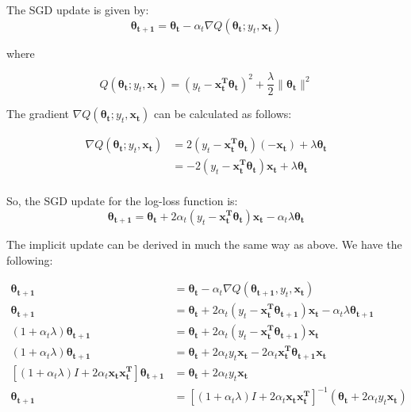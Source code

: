 \documentclass{article}
\renewcommand{\vec}[1]{\boldsymbol{#1}}
\begin{document}
\begin{enumerate}[(a)]
The SGD update is given by:
\begin{equation}
\vec{\theta_{t+1}} = \vec{\theta_{t}} - \alpha_{t}\nabla Q(\vec{\theta_{t}}; y_t, \vec{x_t})
\end{equation}

where

\begin{equation}
Q(\vec{\theta_{t}}; y_t, \vec{x_t}) = \left(y_t - \vec{x_t^T}\vec{\theta_t}\right)^2 + \frac{\lambda}{2}\|\vec{\theta_t}\|^2
\end{equation}

The gradient $\nabla Q(\vec{\theta_{t}}; y_t, \vec{x_t})$ can be calculated as follows:

\begin{align*}
\nabla Q(\vec{\theta_{t}}; y_t, \vec{x_t}) &= 2\left(y_t - \vec{x_t^T}\vec{\theta_t}\right)\left(-\vec{x_t}\right) + \lambda\vec{\theta_t}\\
&= -2(y_t-\vec{x_t^T}\vec{\theta_t})\vec{x_t} + \lambda\vec{\theta_t}\\
\end{align*}

So, the SGD update for the log-loss function is:
\begin{equation}
\vec{\theta_{t+1}} = \vec{\theta_{t}} +2 \alpha_{t}\left( y_t-\vec{x_t^T}\vec{\theta_t} \right )\vec{x_t} - \alpha_t\lambda\vec{\theta_t}
\end{equation}

The implicit update can be derived in much the same way as above. We have the following:

\begin{align*}
\vec{\theta_{t+1}} &= \vec{\theta_t} - \alpha_t \nabla Q(\vec{\theta_{t+1}}, y_t, \vec{x_t})\\
\vec{\theta_{t+1}} &= \vec{\theta_{t}} +2 \alpha_{t}\left( y_t-\vec{x_t^T}\vec{\theta_{t+1}} \right )\vec{x_t} - \alpha_t\lambda\vec{\theta_{t+1}}\\
(1+\alpha_t\lambda)\vec{\theta_{t+1}} &= \vec{\theta_{t}} +2 \alpha_{t}\left( y_t-\vec{x_t^T}\vec{\theta_{t+1}} \right )\vec{x_t}\\
(1+\alpha_t\lambda)\vec{\theta_{t+1}} &= \vec{\theta_{t}} + 2\alpha_t y_t \vec{x_t} - 2\alpha_t\vec{x_t^T}\vec{\theta_{t+1}}\vec{x_t}\\
\left[(1+\alpha_t\lambda)I + 2\alpha_t\vec{x_t}\vec{x_t^T}\right]\vec{\theta_{t+1}} &= \vec{\theta_t} + 2\alpha_t y_t\vec{x_t}\\
\vec{\theta_{t+1}} &= \left[(1+\alpha_t\lambda)I + 2\alpha_t\vec{x_t}\vec{x_t^T}\right]^{-1}\left(\vec{\theta_t} + 2\alpha_t y_t \vec{x_t}\right)
\end{align*}


\end{enumerate}
\end{document}
